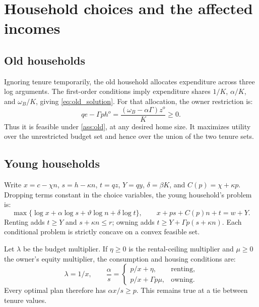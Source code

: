 \documentclass[11pt]{article}
\begin{document}
\clearpage
\appendix
\section{Household choices and the affected incomes}\label{app:households}

\subsection{Old households}

Ignoring tenure temporarily, the old household allocates expenditure across
three log arguments. The first-order conditions imply expenditure shares
$1/K$, $\alpha/K$, and $\omega_B/K$, giving \eqref{eq:old_solution}. For
that allocation, the owner restriction is:
\begin{equation}
qe-\Gamma ph^o=\frac{(\omega_B-\alpha\Gamma)z^o}{K}\ge0.
\end{equation}
Thus it is feasible under \eqref{ass:old}, at any desired home size. It
maximizes utility over the unrestricted budget set and hence over the union
of the two tenure sets.

\subsection{Young households}

Write $x=c-\chi n$, $s=h-\kappa n$, $t=qz$, $Y=qy$,
$\delta=\beta K$, and $C(p)=\chi+\kappa p$. Dropping terms constant in the
choice variables, the young household's problem is:
\begin{equation}
\max\{\log x+\alpha\log s+\vartheta\log n+\delta\log t\},
\qquad x+ps+C(p)n+t=w+Y.
\label{eq:appendix_young}
\end{equation}
Renting adds $t\ge Y$ and $s+\kappa n\le r$; owning adds
$t\ge Y+\Gamma p(s+\kappa n)$. Each conditional problem is strictly
concave on a convex feasible set.

Let $\lambda$ be the budget multiplier. If $\eta\ge0$ is the rental-ceiling
multiplier and $\mu\ge0$ the owner's equity multiplier, the consumption
and housing conditions are:
\begin{equation}
\lambda=1/x,\qquad
\frac{\alpha}{s}=\begin{cases}
p/x+\eta,&\text{renting},\\
p/x+\Gamma p\mu,&\text{owning}.
\end{cases}
\label{eq:young_housing_foc}
\end{equation}
Every optimal plan therefore has $\alpha x/s\ge p$. This remains true at
a tie between tenure values.
\end{document}
